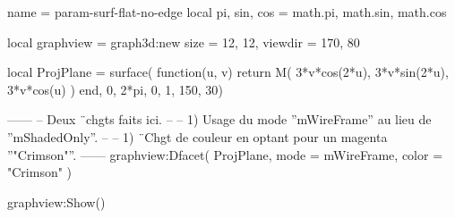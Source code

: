 \documentclass{standalone}
\begin{document}
\begin{luadraw}{name = param-surf-flat-no-edge}
local pi, sin, cos = math.pi, math.sin, math.cos

local graphview = graph3d:new{
  size    = {12, 12},
  viewdir = {170, 80}
}

local ProjPlane =  surface(
  function(u, v)
    return M(
      3*v*cos(2*u),
      3*v*sin(2*u),
      3*v*cos(u)
    )
  end,
  0, 2*pi, 0, 1,
  {150, 30})

------
-- Deux ¨chgts faits ici.
--
--     1) Usage du mode ''mWireFrame'' au lieu de ''mShadedOnly''.
--
--     1) ¨Chgt de couleur en optant pour un magenta ''"Crimson"''.
------
graphview:Dfacet(
  ProjPlane,
  {
    mode  = mWireFrame,
    color = "Crimson"
  })

graphview:Show()
\end{luadraw}
\end{document}
